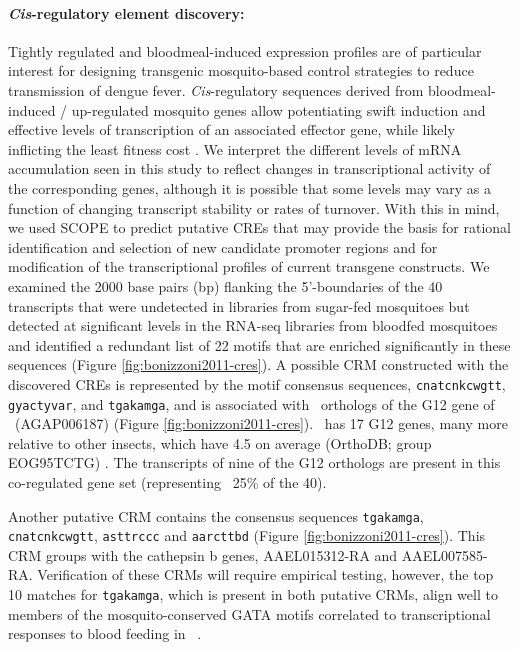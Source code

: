 \paragraph*{\textit{Cis}-regulatory element discovery:}
Tightly regulated and bloodmeal-induced expression profiles are of particular interest for designing transgenic mosquito-based control strategies to reduce transmission of dengue fever. \textit{Cis}-regulatory sequences derived from bloodmeal-induced / up-regulated mosquito genes allow potentiating swift induction and effective levels of transcription of an associated effector gene, while likely inflicting the least fitness cost \cite{Marelli2006,Amenya2010}. We interpret the different levels of mRNA accumulation seen in this study to reflect changes in transcriptional activity of the corresponding genes, although it is possible that some levels may vary as a function of changing transcript stability or rates of turnover. With this in mind, we used \gls{SCOPE} \cite{Carlson2007} to predict putative \glspl{CRE} that may provide the basis for rational identification and selection of new candidate promoter regions and for modification of the transcriptional profiles of current transgene constructs. We examined the 2000 base pairs (bp) flanking the 5'-boundaries of the 40 transcripts that were undetected in libraries from sugar-fed mosquitoes but detected at significant levels in the RNA-seq libraries from bloodfed mosquitoes and identified a redundant list of 22 motifs that are enriched significantly in these sequences (Figure \ref{fig:bonizzoni2011-cres}). A possible \gls{CRM} constructed with the discovered \glspl{CRE} is represented by the motif consensus sequences, \texttt{cnatcnkcwgtt}, \texttt{gyactyvar}, and \texttt{tgakamga}, and is associated with \Aa\  orthologs of the G12 gene of \Ag\ (AGAP006187) (Figure \ref{fig:bonizzoni2011-cres}). \Aea\ has 17 G12 genes, many more relative to other insects, which have 4.5 on average (OrthoDB; group EOG95TCTG) \cite{Kriventseva2008}. The transcripts of nine of the G12 orthologs are present in this co-regulated gene set (representing ~25\% of the 40).

Another putative \gls{CRM} contains the consensus sequences \texttt{tgakamga}, \texttt{cnatcnkcwgtt}, \texttt{asttrccc} and \texttt{aarcttbd} (Figure \ref{fig:bonizzoni2011-cres}). This \gls{CRM} groups with the cathepsin b genes, AAEL015312-RA and AAEL007585-RA. Verification of these \glspl{CRM} will require empirical testing, however, the top 10 matches for \texttt{tgakamga}, which is present in both putative \glspl{CRM}, align well to members of the mosquito-conserved GATA motifs correlated to transcriptional responses to blood feeding in \Ag\ \cite{Sieglaff2009}.





